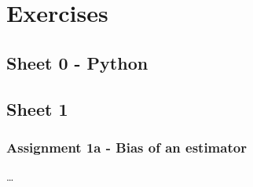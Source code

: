 
\chapter{Exercises}
\section{Sheet 0 - Python}

\newpage
\section{Sheet 1}

\subsection{Assignment 1a - Bias of an estimator} 
\dots
